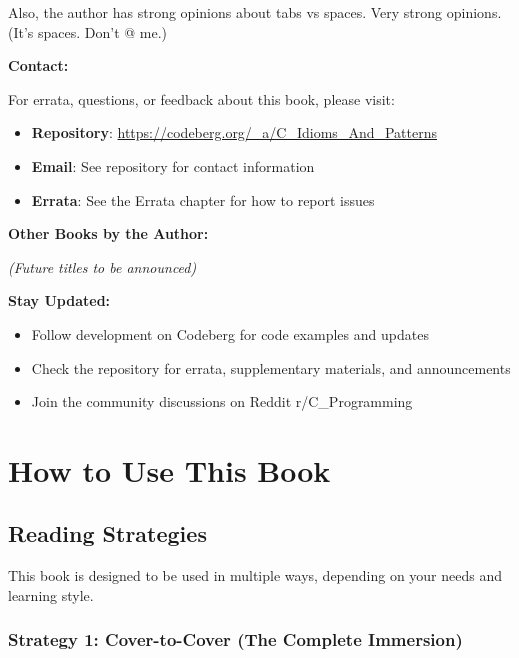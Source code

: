 \documentclass[10pt,openany]{book}
\begin{document}
Also, the author has strong opinions about tabs vs spaces. Very strong opinions. (It's spaces. Don't @ me.)

\vspace{2em}

\textbf{Contact:}

For errata, questions, or feedback about this book, please visit:

\begin{itemize}
    \item \textbf{Repository}: \url{https://codeberg.org/_a/C_Idioms_And_Patterns}
    \item \textbf{Email}: See repository for contact information
    \item \textbf{Errata}: See the Errata chapter for how to report issues
\end{itemize}

\vspace{1em}

\textbf{Other Books by the Author:}

\textit{(Future titles to be announced)}

\vspace{1em}

\textbf{Stay Updated:}

\begin{itemize}
    \item Follow development on Codeberg for code examples and updates
    \item Check the repository for errata, supplementary materials, and announcements
    \item Join the community discussions on Reddit r/C\_Programming
\end{itemize}

\clearpage

\tableofcontents

\chapter{How to Use This Book}

\section*{Reading Strategies}

This book is designed to be used in multiple ways, depending on your needs and learning style.

\subsection*{Strategy 1: Cover-to-Cover (The Complete Immersion)}
\end{document}
